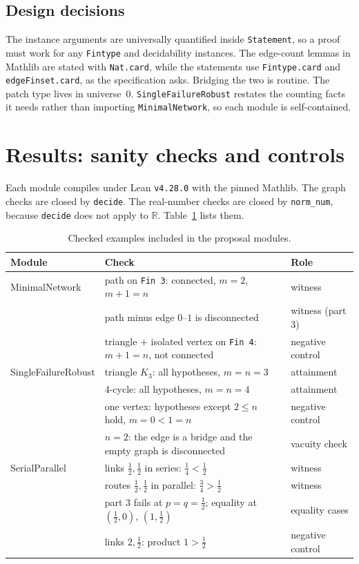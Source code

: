 \documentclass[11pt]{article}
\begin{document}
\subsection{Design decisions}
The instance arguments are universally quantified inside \texttt{Statement}, so a proof must work for
any \texttt{Fintype} and decidability instances. The edge-count lemmas in Mathlib are stated with
\texttt{Nat.card}, while the statements use \texttt{Fintype.card} and \texttt{edgeFinset.card}, as the
specification asks. Bridging the two is routine. The patch type lives in universe~0.
\texttt{SingleFailureRobust} restates the counting facts it needs rather than importing
\texttt{MinimalNetwork}, so each module is self-contained.

\section{Results: sanity checks and controls}
Each module compiles under Lean \texttt{v4.28.0} with the pinned Mathlib. The graph checks are closed
by \texttt{decide}. The real-number checks are closed by \texttt{norm\_num}, because \texttt{decide}
does not apply to $\mathbb{R}$. Table~\ref{tab:checks} lists them.

\begin{table}[h]
\centering\small
\begin{tabular}{@{}lll@{}}
\toprule
Module & Check & Role\\
\midrule
MinimalNetwork & path on \texttt{Fin 3}: connected, $m=2$, $m+1=n$ & witness\\
 & path minus edge $0$--$1$ is disconnected & witness (part 3)\\
 & triangle $+$ isolated vertex on \texttt{Fin 4}: $m+1=n$, not connected & negative control\\
SingleFailureRobust & triangle $K_3$: all hypotheses, $m=n=3$ & attainment\\
 & 4-cycle: all hypotheses, $m=n=4$ & attainment\\
 & one vertex: hypotheses except $2\le n$ hold, $m=0<1=n$ & negative control\\
 & $n=2$: the edge is a bridge and the empty graph is disconnected & vacuity check\\
SerialParallel & links $\tfrac12,\tfrac12$ in series: $\tfrac14<\tfrac12$ & witness\\
 & routes $\tfrac12,\tfrac12$ in parallel: $\tfrac34>\tfrac12$ & witness\\
 & part 3 fails at $p=q=\tfrac12$; equality at $(\tfrac12,0)$, $(1,\tfrac12)$ & equality cases\\
 & links $2,\tfrac12$: product $1>\tfrac12$ & negative control\\
\bottomrule
\end{tabular}
\caption{Checked examples included in the proposal modules.}\label{tab:checks}
\end{table}
\end{document}
